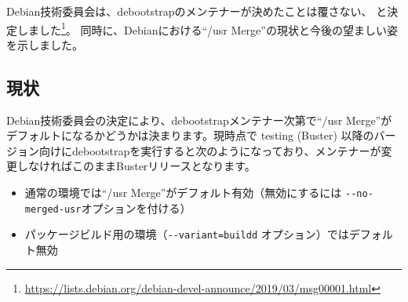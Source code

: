 \documentclass[mingoth,a4paper]{jsarticle}
\begin{document}
%
Debian技術委員会は、debootstrapのメンテナーが決めたことは覆さない、
と決定しました\footnote{\url{https://lists.debian.org/debian-devel-announce/2019/03/msg00001.html}}。
同時に、Debianにおける``/usr Merge''の現状と今後の望ましい姿を示しました。

\subsection{現状}
Debian技術委員会の決定により、debootstrapメンテナー次第で``/usr Merge''がデフォルトになるかどうかは決まります。現時点で testing (Buster) 以降のバージョン向けにdebootstrapを実行すると次のようになっており、メンテナーが変更しなければこのままBusterリリースとなります。

\begin{itemize}
 \item 通常の環境では``/usr Merge''がデフォルト有効（無効にするには \verb|--no-merged-usr|オプションを付ける）
 \item パッケージビルド用の環境（\verb|--variant=buildd| オプション）ではデフォルト無効
\end{itemize}
\end{document}
